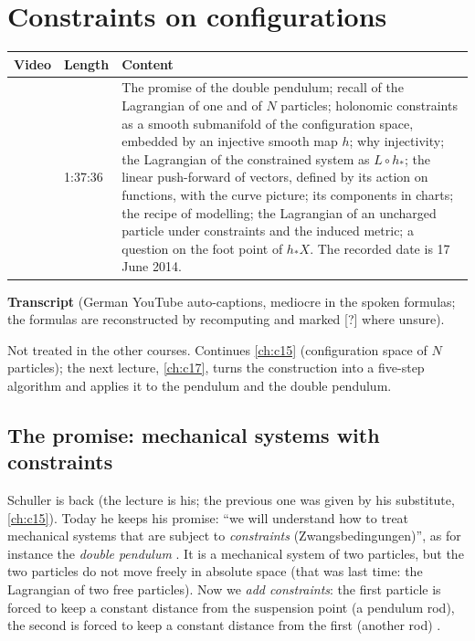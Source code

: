 \chapter{Constraints on configurations}\label{ch:c16}
\begin{paracol}{2}

\begin{sources}
\begin{tabularx}{\linewidth}{@{}l l L@{}}
\toprule
\textbf{Video} & \textbf{Length} & \textbf{Content}\\
\midrule
{} & 1:37:36 & The promise of the double pendulum; recall of the Lagrangian of one and of $N$ particles; holonomic constraints as a smooth submanifold of the configuration space, embedded by an injective smooth map $h$; why injectivity; the Lagrangian of the constrained system as $L\circ h_*$; the linear push-forward of vectors, defined by its action on functions, with the curve picture; its components in charts; the recipe of modelling; the Lagrangian of an uncharged particle under constraints and the induced metric; a question on the foot point of $h_*X$. The recorded date is 17 June 2014.\\
\bottomrule
\end{tabularx}

\smallskip
\textbf{Transcript}  (German YouTube auto-captions, mediocre in the spoken formulas; the formulas are reconstructed by recomputing and marked [?] where unsure).
\end{sources}

\begin{reading}
Not treated in the other courses.
Continues \cref{ch:c15} (configuration space of $N$ particles); the next lecture, \cref{ch:c17}, turns the construction into a five-step algorithm and applies it to the pendulum and the double pendulum.
\end{reading}

\section{The promise: mechanical systems with constraints}\label{sec:zw-promise}

Schuller is back (the lecture is his; the previous one was given by his substitute, \cref{ch:c15}). Today he keeps his promise: ``we will understand how to treat mechanical systems that are subject to \emph{constraints} (Zwangsbedingungen)'', as for instance the \emph{double pendulum} . It is a mechanical system of two particles, but the two particles do not move freely in absolute space (that was last time: the Lagrangian of two free particles). Now we \emph{add constraints}: the first particle is forced to keep a constant distance from the suspension point (a pendulum rod), the second is forced to keep a constant distance from the first (another rod) .


\end{paracol}
